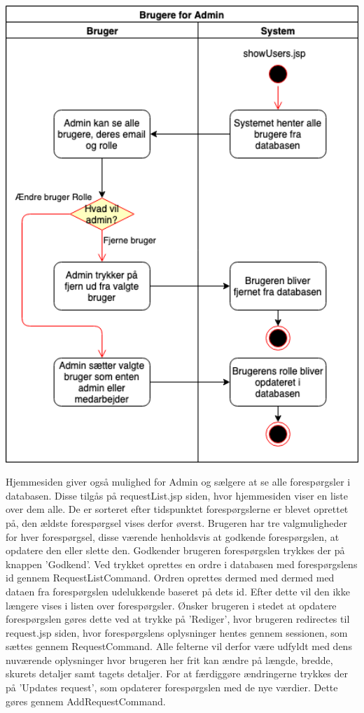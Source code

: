 \documentclass[11pt]{report}
\begin{document}
\begin{center}
\includegraphics[width=13.5cm]{BrugereAdmin.png}
\end{center}
Hjemmesiden giver også mulighed for Admin og sælgere at se alle forespørgsler i databasen. Disse tilgås på requestList.jsp siden, hvor hjemmesiden viser en liste over dem alle. De er sorteret efter tidspunktet forespørgslerne er blevet oprettet på, den ældste forespørgsel vises derfor øverst. Brugeren har tre valgmuligheder for hver forespørgsel, disse værende henholdsvis at godkende forespørgslen, at opdatere den eller slette den.
Godkender brugeren forespørgslen trykkes der på knappen ’Godkend’. Ved trykket oprettes en ordre i databasen med forespørgslens id gennem RequestListCommand. Ordren oprettes dermed med dermed med dataen fra forespørgslen udelukkende baseret på dets id. Efter dette vil den ikke længere vises i listen over forespørgsler.
Ønsker brugeren i stedet at opdatere forespørgslen gøres dette ved at trykke på ’Rediger’, hvor brugeren redirectes til request.jsp siden, hvor forespørgslens oplysninger hentes gennem sessionen, som sættes gennem RequestCommand. Alle felterne vil derfor være udfyldt med dens nuværende oplysninger hvor brugeren her frit kan ændre på længde, bredde, skurets detaljer samt tagets detaljer. For at færdiggøre ændringerne trykkes der på ’Updates request’, som opdaterer forespørgslen med de nye værdier. Dette gøres gennem AddRequestCommand.
\end{document}
